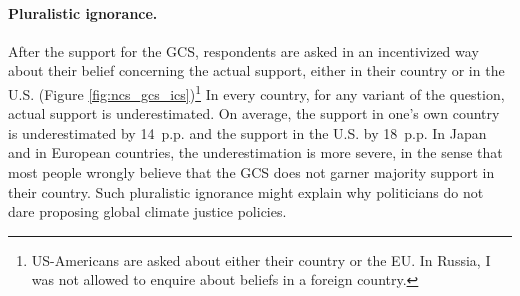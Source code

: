 \documentclass[12pt,english]{article}
\begin{document}
\begin{bibunit}
\paragraph{Pluralistic ignorance.} 
After the support for the GCS, respondents are asked in an incentivized way about their belief concerning the actual support, either in their country or in the U.S. (Figure \ref{fig:ncs_gcs_ics})\footnote{US-Americans are asked about either their country or the EU. In Russia, I was not allowed to enquire about beliefs in a foreign country.} In every country, for any variant of the question, actual support is underestimated. On average, the support in one's own country is underestimated by 14~p.p. and the support in the U.S. by 18~p.p. In Japan and in European countries, the underestimation is more severe, in the sense that most people wrongly believe that the GCS does not garner majority support in their country. Such pluralistic ignorance might explain why politicians do not dare proposing global climate justice policies. %


\end{bibunit}
\end{document}
